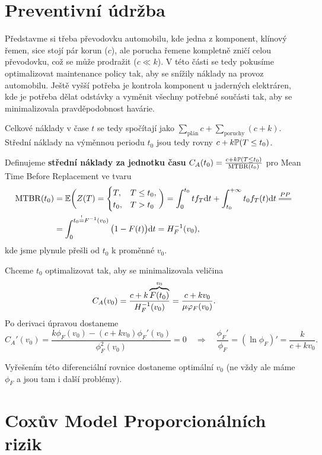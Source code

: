 \section{Preventivní údržba}

    Představme si třeba převodovku automobilu, kde jedna z komponent, klínový řemen, sice stojí pár korun ($c$), ale porucha řemene kompletně zničí celou převodovku, což se může prodražit ($c\ll k$). V této části se tedy pokusíme optimalizovat maintenance policy tak, aby se snížily náklady na provoz automobilu. Ještě vyšší potřeba je kontrola komponent u jaderných elektráren, kde je potřeba dělat odstávky a vyměnit všechny potřebné součásti tak, aby se minimalizovala pravděpodobnost havárie.

    Celkové náklady v čase $t$ se tedy spočítají jako $\sum_{\text{plán}}c+\sum_{\text{poruchy}}(c+k)$. Střední náklady na výměnnou periodu $t_0$ jsou tedy rovny $c+k\mathbb{P}(T\leq t_0)$.
    
   \begin{define}
        Definujeme \textbf{střední náklady za jednotku času} $C_A(t_0)=\frac{c+k\mathbb{P}(T\leq t_0)}{\mathrm{MTBR}(t_0)}$ pro Mean Time Before Replacement ve tvaru \[
    \begin{split}
        \mathrm{MTBR}(t_0)&=\E\bigg(Z(T)=\begin{cases}
            T,& T\leq t_0,\\ t_0,& T>t_0
        \end{cases}\bigg)=\int_{0}^{t_0}tf_T\d t+\int_{t_0}^{+\infty}t_0 f_T(t)\d t\equal{PP} \\ &= \int_{0}^{t_0\stackrel{!}{=}\inv{F}(v_0)}\big(1-F(t)\big)\d t=\HF(v_0),
    \end{split}
    \]
    kde jsme plynule přešli od $t_0$ k proměnné $v_0$.
    \end{define}
    
    Chceme $t_0$ optimalizovat tak, aby se minimalizovala veličina 
    $$C_A(v_0)=\frac{c+k\overbrace{F(t_0)}^{v_0}}{H_F^{-1}(v_0)}=\frac{c+kv_0}{\mu\varphi_F(v_0)}.$$ 
    Po derivaci úpravou dostaneme 
    $$ C_A'(v_0)=\frac{k\phi_F(v_0)-(c+kv_0)\phi_F'(v_0)}{\phi_F^2(v_0)}=0\quad\Rightarrow\quad \frac{\phi_F'}{\phi_F}=(\ln \phi_F)'=\frac{k}{c+kv_0}.$$

    Vyřešením této diferenciální rovnice dostaneme optimální $v_0$ (ne vždy ale máme $\phi_F$ a jsou tam i další problémy).

\section{Coxův Model Proporcionálních rizik}

